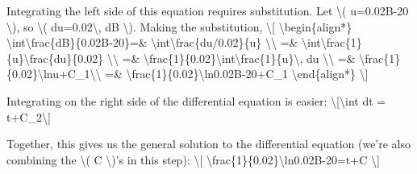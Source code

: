 Integrating the left side of this equation requires substitution. Let
\textbackslash{}( u=0.02B-20 \textbackslash{}), so \textbackslash{}(
du=0.02\textbackslash{}, dB \textbackslash{}). Making the substitution,
\textbackslash{}{[} \textbackslash{}begin\{align*\}
\textbackslash{}int\textbackslash{}frac\{dB\}\{0.02B-20\}=\&
\textbackslash{}int\textbackslash{}frac\{du/0.02\}\{u\}
\textbackslash{}\textbackslash{} =\&
\textbackslash{}int\textbackslash{}frac\{1\}\{u\}\textbackslash{}frac\{du\}\{0.02\}
\textbackslash{}\textbackslash{} =\&
\textbackslash{}frac\{1\}\{0.02\}\textbackslash{}int\textbackslash{}frac\{1\}\{u\}\textbackslash{},
du \textbackslash{}\textbackslash{} =\&
\textbackslash{}frac\{1\}\{0.02\}\textbackslash{}ln\textbar{}u\textbar{}+C\_1\textbackslash{}\textbackslash{}
=\&
\textbackslash{}frac\{1\}\{0.02\}\textbackslash{}ln\textbar{}0.02B-20\textbar{}+C\_1
\textbackslash{}end\{align*\} \textbackslash{}{]}

Integrating on the right side of the differential equation is easier:
\textbackslash{}{[}\textbackslash{}int dt = t+C\_2\textbackslash{}{]}

Together, this gives us the general solution to the differential
equation (we're also combining the \textbackslash{}( C
\textbackslash{})'s in this step): \textbackslash{}{[}
\textbackslash{}frac\{1\}\{0.02\}\textbackslash{}ln\textbar{}0.02B-20\textbar{}=t+C
\textbackslash{}{]}

